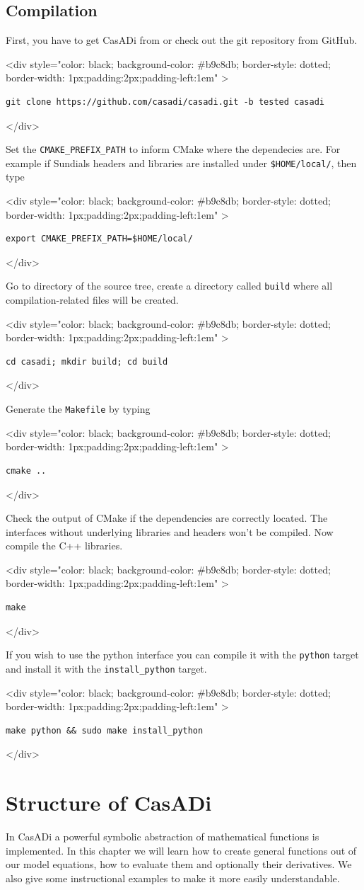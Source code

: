 \documentclass[a4paper,12pt]{book}
\newcommand{\codebegin}{
\begin{rawhtml}
<div style="color: black; background-color: \#b9c8db;  border-style: dotted; border-width: 1px;padding:2px;padding-left:1em" >
\end{rawhtml}
}
\newcommand{\codeend}{
\begin{rawhtml}
</div>
\end{rawhtml}
}
\newcommand{\codebegin}{

}
\newcommand{\codeend}{

}
\begin{document}
\section{Compilation}
First, you have to get CasADi from  or check out the git repository from GitHub.
\par
\codebegin
\begin{verbatim}
git clone https://github.com/casadi/casadi.git -b tested casadi
\end{verbatim}
\codeend
Set the \texttt{CMAKE\_PREFIX\_PATH} to inform CMake where the dependecies are. 
For example if Sundials headers and libraries are installed under \texttt{\$HOME/local/}, then type
\par
\codebegin{
\begin{verbatim}
export CMAKE_PREFIX_PATH=$HOME/local/
\end{verbatim}
\codeend
\par
Go to directory of the source tree, create a directory called \texttt{build} where all compilation-related files will be created.
\par
\codebegin
\begin{verbatim}
cd casadi; mkdir build; cd build
\end{verbatim}
\codeend
Generate the \texttt{Makefile} by typing
\par
\codebegin
\begin{verbatim}
cmake ..
\end{verbatim}
\codeend
Check the output of CMake if the dependencies are correctly located. The interfaces without underlying libraries and headers won't be compiled.
Now compile the C++ libraries.
\par
\codebegin
\begin{verbatim}
make
\end{verbatim}
\codeend
If you wish to use the python interface you can compile it with the \texttt{python} target and install it with the \texttt{install\_python} target.
\par
\codebegin
\begin{verbatim}
make python && sudo make install_python
\end{verbatim}
\codeend

\chapter{Structure of CasADi}
In CasADi a powerful symbolic abstraction of mathematical functions is implemented.
In this chapter we will learn how to create general functions out of our model equations, 
how to evaluate them and optionally their derivatives. We also give some instructional
examples to make it more easily understandable.

}
\end{document}
